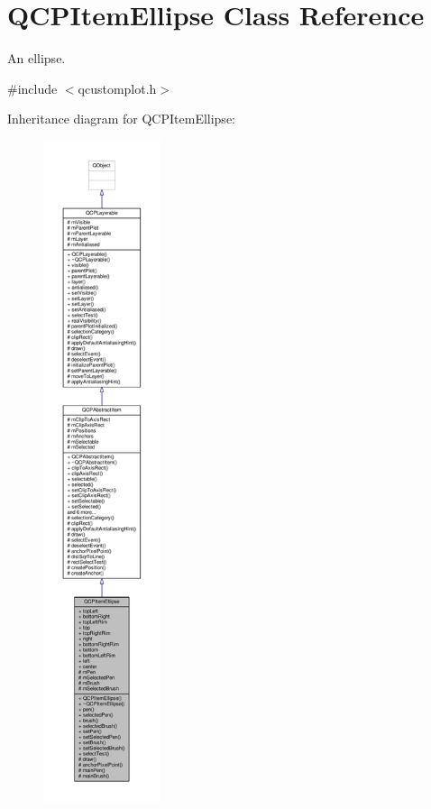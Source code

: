 \hypertarget{class_q_c_p_item_ellipse}{}\section{Q\+C\+P\+Item\+Ellipse Class Reference}
\label{class_q_c_p_item_ellipse}


An ellipse.  




{\ttfamily \#include $<$qcustomplot.\+h$>$}



Inheritance diagram for Q\+C\+P\+Item\+Ellipse\+:\nopagebreak
\begin{figure}[H]
\begin{center}
\leavevmode
\includegraphics[height=550pt]{class_q_c_p_item_ellipse__inherit__graph}
\end{center}
\end{figure}


